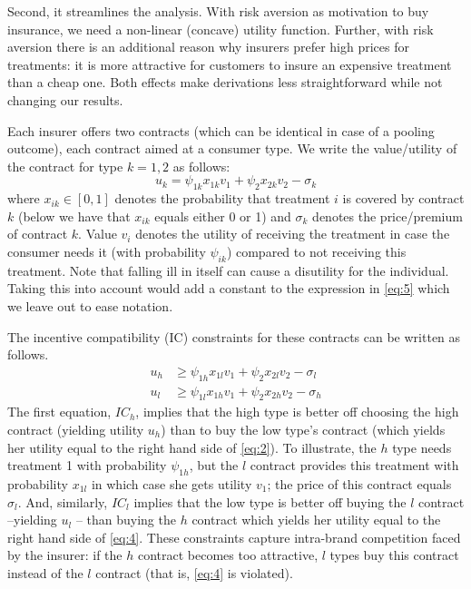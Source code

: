 \documentclass[a4paper,12pt]{article}
\begin{document}
Second, it streamlines the analysis. With risk aversion as motivation to buy insurance, we need a non-linear (concave) utility function. Further, with risk aversion there is an additional reason why insurers prefer high prices for treatments: it is more attractive for customers to insure an expensive treatment than a cheap one. Both effects make derivations less straightforward while not changing our results.

Each insurer offers two contracts (which can be identical in case of a pooling outcome), each contract aimed at a consumer type. We write the value/utility of the contract for type \(k=1,2\) as follows:
\begin{equation}
\label{eq:5}
u_{k} = \psi_{1k} x_{1k} v_1 + \psi_{2} x_{2k} v_2 - \sigma_k
\end{equation}
where \(x_{ik} \in [0,1]\) denotes the probability that treatment \(i\) is covered by contract \(k\) (below we have that \(x_{ik}\) equals either 0 or 1) and \(\sigma_k\) denotes the price/premium of contract \(k\). Value \(v_i\) denotes the utility of receiving the treatment in case the consumer needs it (with probability \(\psi_{ik}\)) compared to not receiving this treatment. Note that falling ill in itself can cause a disutility for the individual. Taking this into account would add a constant to the expression in \eqref{eq:5} which we leave out to ease notation.

The incentive compatibility (IC) constraints for these contracts can be written as follows.
\begin{align}
\label{eq:2}
u_h &\geq  \psi_{1h} x_{1l} v_1 + \psi_{2} x_{2l} v_2 - \sigma_{l} \\
\label{eq:4}
u_l &\geq  \psi_{1l} x_{1h} v_1 + \psi_{2} x_{2h} v_2 - \sigma_h
\end{align}
The first equation, \(IC_h\), implies that the high type is better off choosing the high contract (yielding utility \(u_h\)) than to buy the low type's contract (which yields her utility equal to the right hand side of \eqref{eq:2}). To illustrate, the \(h\) type needs treatment 1 with probability \(\psi_{1h}\), but the \(l\) contract provides this treatment with probability \(x_{1l}\) in which case she gets utility \(v_{1}\); the price of this contract equals \(\sigma_{l}\). And, similarly, \(IC_l\) implies that the low type is better off buying the \(l\) contract --yielding \(u_l\) -- than buying the \(h\) contract which yields her utility equal to the right hand side of \eqref{eq:4}. These constraints capture intra-brand competition faced by the insurer: if the \(h\) contract becomes too attractive, \(l\) types buy this contract instead of the \(l\) contract (that is, \eqref{eq:4} is violated).
\end{document}
